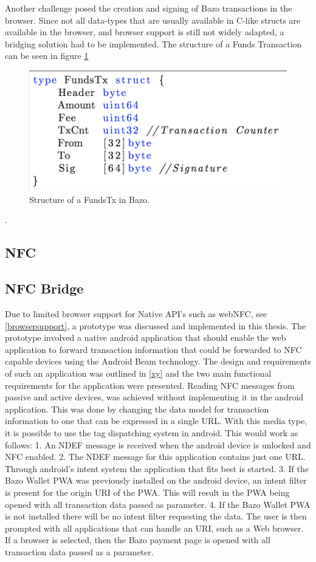 Another challenge posed the creation and signing of Bazo transactions in the browser. Since not all data-types that are usually available in C-like structs are available in the browser, and browser support is still not widely adapted, a bridging solution had to be implemented.
The structure of a Funds Transaction can be seen in figure \ref{fig:FundsTX}

\begin{figure}
\centering
\includegraphics[width=1\textwidth]{diagrams/AccountTx_struct.png}
\caption{\label{fig:FundsTX}Structure of a FundsTx in Bazo.}
\end{figure}.


\subsection{NFC}
\subsection{NFC Bridge}\label{nfcbridge}
Due to limited browser support for Native API's such as webNFC, see \ref{browsersupport}, a prototype was discussed and implemented in this thesis. The prototype involved a native android application that should enable the web application to forward transaction information that could be forwarded to NFC capable devices using the Android Beam technology.
The design and requirements of such an application was outlined in \ref{xy} and the two main functional requirements for the application were presented.
Reading NFC messages from passive and active devices, was achieved without implementing it in the android application. This was done by changing the data model for transaction information to one that can be expressed in a single URL. With this media type, it is possible to use the tag dispatching system in android. This would work as follows:
1. An NDEF message is received when the android device is unlocked and NFC enabled.
2. The NDEF message for this application contains just one URL. Through android's intent system the application that fits best is started.
3. If the Bazo Wallet PWA was previously installed on the android device, an intent filter is present for the origin URI of the PWA. This will result in the PWA being opened with all transaction data passed as parameter.
4. If the Bazo Wallet PWA is not installed there will be no intent filter requesting the data. The user is then prompted with all applications that can handle an URI, such as a Web browser. If a browser is selected, then the Bazo payment page is opened with all transaction data passed as a parameter.

